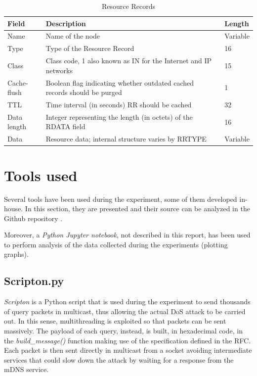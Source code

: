 \documentclass[fleqn, 11pt]{SelfArx} %
\begin{document}
\begin{table}[hbt]
	\centering
	\begin{tabular}{|C{2.0cm}|C{4.2cm}|C{1.25cm}|}
		\hline
		\textbf{Field} & \textbf{Description} & \textbf{Length} \\
		\hline
		\hline
		Name & Name of the node & Variable\\
		\hline
		Type & Type of the Resource Record & 16\\
		\hline
		Class & Class code, 1 also known as IN for the Internet and IP networks & 15\\
		\hline
		Cache-flush & Boolean flag indicating whether outdated cached records should be purged & 1\\
		\hline
		TTL & Time interval (in seconds) RR should be cached & 32\\
		\hline
		Data length & Integer representing the length (in octets) of the RDATA field & 16\\
		\hline
		Data & Resource data; internal structure varies by RRTYPE & Variable\\
		\hline
	\end{tabular}
	\caption{Resource Records}
	\label{table}
\end{table}


\section{Tools used}
Several tools have been used during the experiment, some of them developed in-house. In this section, they are presented and their source can be analyzed in the Github repository \cite{mDNS-security}. 

Moreover, a {\it{Python Jupyter notebook}}, not described in this report, has been used to perform analysis of the data collected during the experiments (plotting graphs).

\subsection{Scripton.py}
\textit{Scripton} is a Python script that is used during the experiment to send thousands of query packets in multicast, thus allowing the actual DoS attack to be carried out.
In this sense, multithreading is exploited so that packets can be sent massively. The payload of each query, instead, is built, in hexadecimal code, in the \textit{build\_message()} function making use of the specification defined in the RFC\cite{rfc6762}. Each packet is then sent directly in multicast from a socket avoiding intermediate services that could slow down the attack by waiting for a response from the mDNS service.
\end{document}
